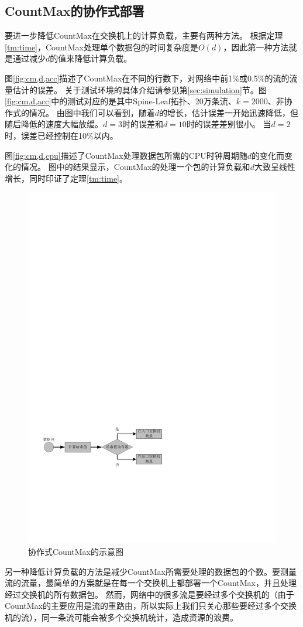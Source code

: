 \subsection{CountMax的协作式部署}\label{sec:coop}
要进一步降低CountMax在交换机上的计算负载，主要有两种方法。
根据定理\ref{tm:time}，CountMax处理单个数据包的时间复杂度是$O(d)$，因此第一种方法就是通过减少$d$的值来降低计算负载。

图\ref{fig:cm,d,acc}描述了CountMax在不同的行数下，对网络中前1\%或0.5\%的流的流量估计的误差。
关于测试环境的具体介绍请参见第\ref{sec:simulation}节。图\ref{fig:cm,d,acc}中的测试对应的是其中Spine-Leaf拓扑、20万条流、$k=2000$、非协作式的情况。
由图中我们可以看到，随着$d$的增长，估计误差一开始迅速降低，但随后降低的速度大幅放缓。$d=3$时的误差和$d=10$时的误差差别很小。
当$d=2$时，误差已经控制在10\%以内。

图\ref{fig:cm,d,cpu}描述了CountMax处理数据包所需的CPU时钟周期随$d$的变化而变化的情况。
图中的结果显示，CountMax的处理一个包的计算负载和$d$大致呈线性增长，同时印证了定理\ref{tm:time}。

\begin{figure}[h]
   \centering
   \includegraphics[width=0.7\linewidth]{fig/filter_measure.pdf}
   \caption{协作式CountMax的示意图}
   \label{fig:filtermeasurement}
\end{figure}

另一种降低计算负载的方法是减少CountMax所需要处理的数据包的个数。要测量流的流量，最简单的方案就是在每一个交换机上都部署一个CountMax，并且处理经过交换机的所有数据包。
然而，网络中的很多流是要经过多个交换机的（由于CountMax的主要应用是流的重路由，所以实际上我们只关心那些要经过多个交换机的流），同一条流可能会被多个交换机统计，造成资源的浪费。

